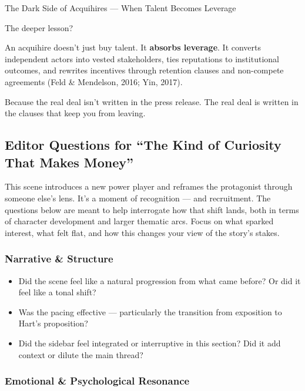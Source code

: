 \begin{HistoricalSidebar}{The Dark Side of Acquihires --- When Talent Becomes Leverage}
  \medskip
  
  The deeper lesson?

  \medskip
  
  An acquihire doesn’t just buy talent. It \textbf{absorbs leverage}. It converts independent actors 
  into vested stakeholders, ties reputations to institutional outcomes, and rewrites incentives through 
  retention clauses and non-compete agreements (Feld \& Mendelson, 2016; Yin, 2017).

  Because the real deal isn’t written in the press release.  
  The real deal is written in the clauses that keep you from leaving.
  
\end{HistoricalSidebar}



\subsection*{Editor Questions for ``The Kind of Curiosity That Makes Money''}

This scene introduces a new power player and reframes the protagonist through someone else’s lens. It’s a moment of recognition — and recruitment. The questions below are meant to help interrogate how that shift lands, both in terms of character development and larger thematic arcs. Focus on what sparked interest, what felt flat, and how this changes your view of the story’s stakes.

\subsubsection*{Narrative \& Structure}

\begin{itemize}
  \item Did the scene feel like a natural progression from what came before? Or did it feel like a tonal shift?
  \item Was the pacing effective — particularly the transition from exposition to Hart’s proposition?
  \item Did the sidebar feel integrated or interruptive in this section? Did it add context or dilute the main thread?
\end{itemize}

\subsubsection*{Emotional \& Psychological Resonance}

